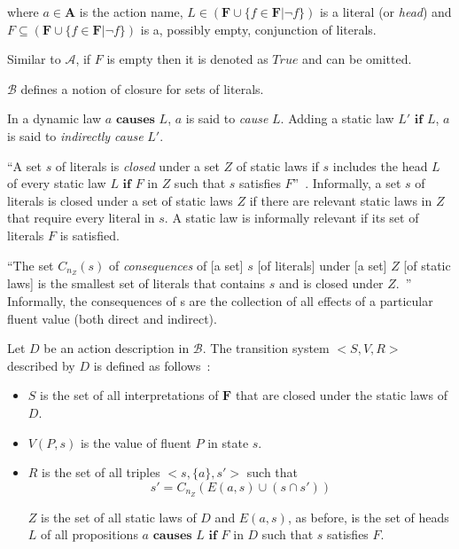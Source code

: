 \noindent
where $a \in \boldsymbol{A}$ is the action name, $L \in(\boldsymbol{F} \cup\{f \in \boldsymbol{F}| \neg f\})$ is a literal (or \textit{head}) and $F \subseteq(\boldsymbol{F} \cup\{f \in \boldsymbol{F}| \neg f\})$ is a, possibly empty, conjunction of literals.

Similar to $\mathcal{A}$, if $F$ is empty then it is denoted as $True$ and can be omitted.

$\mathcal{B}$ defines a notion of closure for sets of literals.

\begin{definition}
    In a dynamic law $a \textbf{ causes } L$, $a$ is said to \textit{cause} $L$.
    Adding a static law $L' \textbf{ if } L$, $a$ is said to \textit{indirectly cause} $L'$.
\end{definition}

\begin{definition}
    ``A set $s$ of literals is \textit{closed} under a set $Z$ of static laws if $s$ includes the head $L$ of every static law $L \textbf{ if } F$ in $Z$ such that $s$ satisfies $F$''~\citep{gelfond_action_1998}.
    Informally, a set $s$ of literals is closed under a set of static laws $Z$ if there are relevant static laws in $Z$ that require every literal in $s$.
    A static law is informally relevant if its set of literals $F$ is satisfied.
\end{definition}

\begin{definition}
    ``The set $C_{n_Z}\left(s\right)$ of \textit{consequences} of [a set] $s$ [of literals] under [a set] $Z$ [of static laws] is the smallest set of literals that contains $s$ and is closed under $Z$.~\citep{gelfond_action_1998}''
    Informally, the consequences of s are the collection of all effects of a particular fluent value (both direct and indirect).
\end{definition}

\begin{definition}

    Let $D$ be an action description in $\mathcal{B}$.
    The transition system $< S, V, R >$ described by $D$ is defined as follows~\citep{gelfond_action_1998}:

    \begin{itemize}
        \item $S$ is the set of all interpretations of $\boldsymbol{F}$ that are closed under the static laws of $D$.
        \item $ V(P, s) $ is the value of fluent $P$ in state $s$.
        \item $R$ is the set of all triples $<s, \{a\}, s'>$ such that
            \[
            s'=C_{n_Z}\left(E\left(a,s\right)\cup\left(s \cap s'\right)\right)
            \]

            $ Z $ is the set of all static laws of $D$ and $E(a, s)$, as before, is the set of heads $L$ of all propositions $a \textbf{ causes } L \textbf{ if } F$ in $D$ such that $s$ satisfies $F$.
    \end{itemize}
\end{definition}

